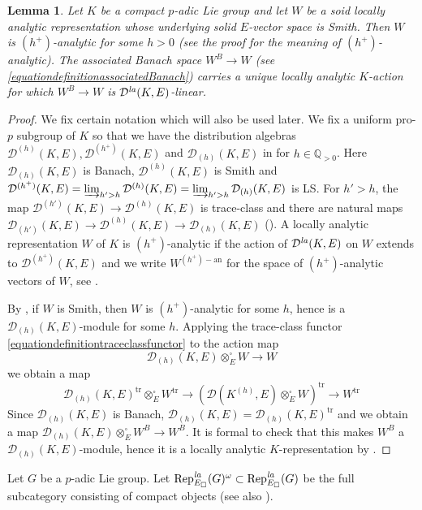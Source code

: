 \documentclass[a4paper,10pt]{amsart}
\theoremstyle{remark}
\theoremstyle{definition}
\theoremstyle{plain}
\newtheorem{lemma}[theorem]{Lemma}
\numberwithin{equation}{section}
\newcommand{\bbQ}{{\mathbb Q}}
\newcommand{\calD}{{\mathcal D}}
\newcommand{\la}{{\it la}}
\newcommand{\Rep}{{\rm Rep}}
\newcommand{\trace}{\mathrm{tr}}
\begin{document}
\begin{lemma}\label{lem:Banachification-analytic}
Let $K$ be a compact $p$-adic Lie group and let $W$ be a
soid locally analytic representation whose underlying solid $E$-vector space is Smith. Then $W$ is $(h^+)$-analytic for some $h>0$ (see the proof for the meaning of $(h^+)$-analytic). The associated Banach space $W^B\rightarrow W$ (see \eqref{equationdefinitionassociatedBanach}) carries a unique locally analytic $K$-action for which $W^B\rightarrow W$ is
$\calD^{\la}(K,E)$-linear. 
\end{lemma}

\begin{proof}
We fix certain notation which will also be used later. We fix a uniform pro-$p$ subgroup of $K$ so that we have the distribution algebras $\calD^{(h)}(K,E), \calD^{(h^+)}(K,E)$  and $\calD_{(h)}(K,E)$ in \cite[\S~4.1.4]{rodrigues2022solid} for $h\in \bbQ_{>0}$. Here $\calD_{(h)}(K,E)$ is Banach, $\calD^{(h)}(K,E)$ is Smith and $\calD^{(h^+)}(K,E)=\varinjlim_{h'>h}\calD^{(h)}(K,E)=\varinjlim_{h'>h}\calD_{(h)}(K,E)$ is LS. For $h'>h$, the map $\calD^{(h')}(K,E)\rightarrow \calD^{(h)}(K,E)$ is trace-class and there are natural maps $\calD_{(h')}(K,E)\rightarrow \calD^{(h)}(K,E)\rightarrow \calD_{(h)}(K,E)$ (\cite[Cor.~4.18]{rodrigues2022solid}). A locally analytic representation $W$ of $K$ is $(h^+)$-analytic if the action of $\calD^{\la}(K,E)$ on $W$ extends to $\calD^{(h^+)}(K,E)$ and we write $W^{(h^+)-\mathrm{an}}$ for the space of $(h^+)$-analytic vectors of $W$, see \cite[Def.~4.29, Thm.~4.36]{rodrigues2022solid}. 

By \cite[Prop.~4.41]{rodrigues2022solid}, if $W$ is Smith, then $W$ is $(h^+)$-analytic for some $h$, hence is a $\calD_{(h)}(K,E)$-module for some $h$. Applying the trace-class functor \eqref{equationdefinitiontraceclassfunctor} to the action map 
\[\calD_{(h)}(K,E)\otimes_{E}^{\square}W\rightarrow W\] 
we obtain a map
\[
	\calD_{(h)}(K,E)^\trace\otimes_{E}^{\square}W^\trace\rightarrow (\calD(K^{(h)},E)\otimes_{E}^{\square}W)^\trace
 \rightarrow W^\trace
\]
Since $\calD_{(h)}(K,E)$ is Banach, $\calD_{(h)}(K,E)=\calD_{(h)}(K,E)^\trace$ and we obtain a map $\calD_{(h)}(K,E)\otimes_E^{\square}W^B\rightarrow W^B$. It is formal to check that this makes $W^B$ a $\calD_{(h)}(K,E)$-module, hence it is a locally analytic $K$-representation by \cite[Thm.~4.36]{rodrigues2022solid}. 
\end{proof}
Let $G$ be a $p$-adic Lie group. Let $\Rep^{\la}_{E_{\square}}(G)^{\omega}\subset \Rep^{\la}_{E_{\square}}(G)$ be the full subcategory consisting of compact objects \cite[\href{https://stacks.math.columbia.edu/tag/07LS}{Tag 07LS}]{stacks-project} (see also \cite[Prop.~1.4.4.1(3)]{lurie2017higher}).
\end{document}
